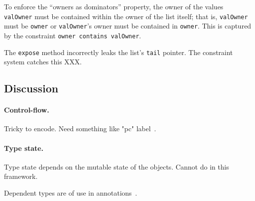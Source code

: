 To enforce the ``owners as dominators'' property, the owner of
the values {\tt valOwner} must be contained within the owner
of the list itself; that is, {\tt valOwner} must be {\tt owner}
or {\tt valOwner}'s owner must be contained in {\tt owner}.
This is captured by the constraint {\tt owner contains valOwner}.

The {\tt expose} method incorrectly leaks the
list's {\tt tail} pointer.
The constraint system catches this XXX.

\subsection{Discussion}

\paragraph{Control-flow.}
Tricky to encode.  Need something like "pc" label~\cite{jif}.

\paragraph{Type state.}
Type state depends on the mutable state of the 
objects.  Cannot do in this framework.

Dependent types are of use in annotations~\cite{ns07-x10anno}.
